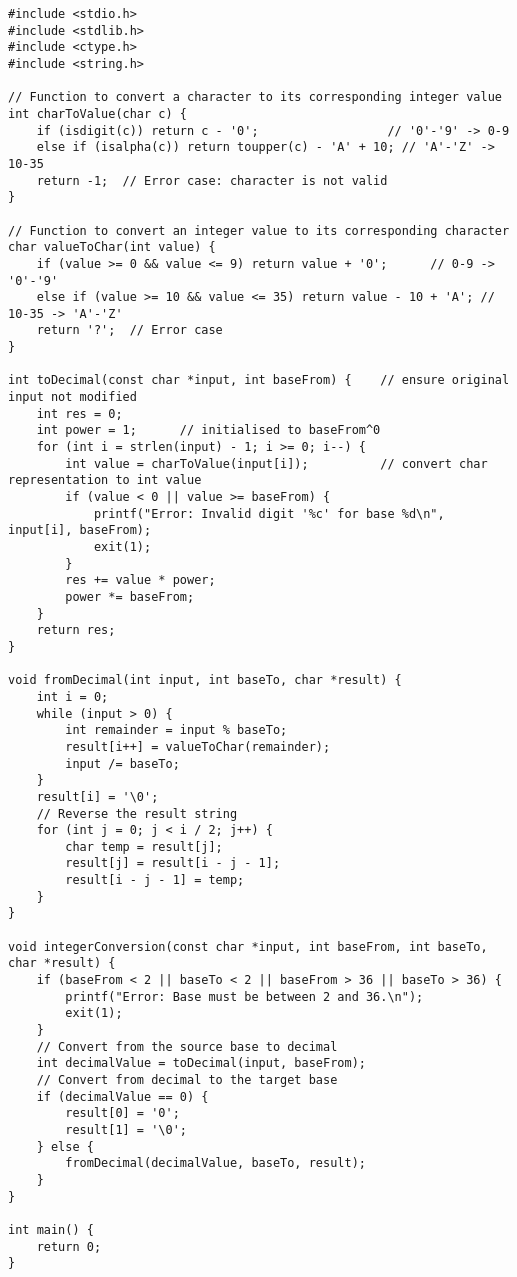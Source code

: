 \documentclass[12pt]{article} %
\begin{document}
\begin{lstlisting}
#include <stdio.h>
#include <stdlib.h>
#include <ctype.h>
#include <string.h>

// Function to convert a character to its corresponding integer value
int charToValue(char c) {
    if (isdigit(c)) return c - '0';                  // '0'-'9' -> 0-9
    else if (isalpha(c)) return toupper(c) - 'A' + 10; // 'A'-'Z' -> 10-35
    return -1;  // Error case: character is not valid
}

// Function to convert an integer value to its corresponding character
char valueToChar(int value) {
    if (value >= 0 && value <= 9) return value + '0';      // 0-9 -> '0'-'9'
    else if (value >= 10 && value <= 35) return value - 10 + 'A'; // 10-35 -> 'A'-'Z'
    return '?';  // Error case
}

int toDecimal(const char *input, int baseFrom) {    // ensure original input not modified
    int res = 0;
    int power = 1;      // initialised to baseFrom^0
    for (int i = strlen(input) - 1; i >= 0; i--) {
        int value = charToValue(input[i]);          // convert char representation to int value
        if (value < 0 || value >= baseFrom) {
            printf("Error: Invalid digit '%c' for base %d\n", input[i], baseFrom);
            exit(1);
        }
        res += value * power;
        power *= baseFrom;
    }
    return res;
}

void fromDecimal(int input, int baseTo, char *result) {
    int i = 0;
    while (input > 0) {
        int remainder = input % baseTo;
        result[i++] = valueToChar(remainder);
        input /= baseTo;
    }
    result[i] = '\0';
    // Reverse the result string
    for (int j = 0; j < i / 2; j++) {
        char temp = result[j];
        result[j] = result[i - j - 1];
        result[i - j - 1] = temp;
    }
}

void integerConversion(const char *input, int baseFrom, int baseTo, char *result) {
    if (baseFrom < 2 || baseTo < 2 || baseFrom > 36 || baseTo > 36) {
        printf("Error: Base must be between 2 and 36.\n");
        exit(1);
    }
    // Convert from the source base to decimal
    int decimalValue = toDecimal(input, baseFrom);
    // Convert from decimal to the target base
    if (decimalValue == 0) {
        result[0] = '0';
        result[1] = '\0';
    } else {
        fromDecimal(decimalValue, baseTo, result);
    }
}

int main() {
    return 0;
}

\end{lstlisting}
\end{document}
